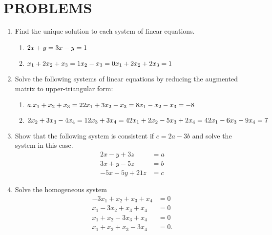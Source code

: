 \documentclass[../main.tex]{subfiles}
\begin{document}
\section[Problems]{ PROBLEMS}
\begin{enumerate}[label=\textbf{2.\arabic*}]

\item Find the unique solution to each system of linear equations.

	\begin{enumerate}[label=\textbf{\alph*.}]
	\item $2x + y = 3\\
				x - y = 1$
	\item $x_1 + 2x_2 + x_3 = 1\\
				x_2 - x_3 = 0\\
				x_1 + 2x_2 + 2x_3 = 1$
	\end{enumerate}

\item Solve the following systems of linear equations by reducing the augmented matrix to upper-triangular form:

		\begin{enumerate}[label=\textbf{\alph*.}]
		\item $a. x_1 + x_2 + x_3 = 2\\
					2x_1 + 3x_2 - x_3 = 8\\
					x_1 - x_2 - x_3 = -8$
		\item $2x_2+3x_3 - 4x_4 = 1\\
					2x_3+3x_4 = 4\\
					2x_1 + 2x_2 - 5x_3 + 2x_4 = 4\\
					2x_1 - 6x_3+9x_4= 7$
		\end{enumerate}

\item Show that the following system is consistent if $c = 2a - 3b$ and solve the system in this case.
$$
\begin{aligned}
2x - y+3z &= a\\
3x + y - 5z &= b\\
-5x - 5y+21z &= c
\end{aligned}
$$

\item Solve the homogeneous system
$$\begin{aligned}
-3x_1 + x_2 + x_3 + x_4 &= 0\\
x_1 - 3x_2 + x_3 + x_4 &= 0\\
x_1 + x_2 - 3x_3 + x_4 &= 0\\
x_1 + x_2 + x_3 - 3x_4 &= 0.
\end{aligned}$$


\end{enumerate}
\end{document}
